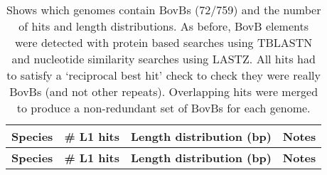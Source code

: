 
{\footnotesize
	\begin{longtable}{| L{4cm} | L{2cm}  | L{5cm} | L{4cm} |} 
		\caption{\footnotesize
			Shows which genomes contain BovBs (72/759) and the number of hits and length distributions.
			As before, BovB elements were detected with protein based searches using TBLASTN and nucleotide similarity searches using LASTZ. 
			All hits had to satisfy a `reciprocal best hit' check to check they were really BovBs (and not other repeats). 
			Overlapping hits were merged to produce a non-redundant set of BovBs for each genome. 
			\label{table:BovBs}} \\
		
		\hline \textbf{Species} & \textbf{\# L1 hits} & \textbf{Length distribution (bp)} & \textbf{Notes} \\ \hline 
		\endfirsthead %
		
		\hline \textbf{Species} & \textbf{\# L1 hits} & \textbf{Length distribution (bp)} & \textbf{Notes} \\ \hline
		\endhead %
		

\end{longtable}}
